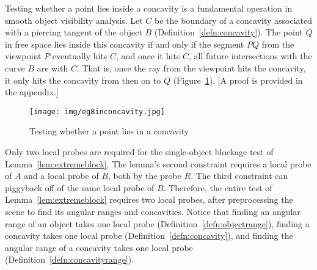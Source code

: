 \documentclass[10pt,twocolumn]{article}
\newcommand{\ray}[1]{\mbox{$\vec{#1}$}}
\newcommand{\seg}[1]{\mbox{$\overline{#1}$}}
\begin{document}

Testing whether a point lies inside a concavity 
is a fundamental operation in smooth object visibility analysis.
Let $C$ be the boundary of a concavity 
associated with a piercing tangent of the object $B$ (Definition~\ref{defn:concavity}).
The point $Q$ in free space lies inside this concavity
if and only if the segment \seg{PQ} from the viewpoint $P$
eventually hits $C$, and once it hits $C$, all future intersections with the curve $B$ 
are with $C$.
That is, once the ray from the viewpoint 
hits the concavity, it only hits the concavity from then on to $Q$ 
(Figure~\ref{fig:inconcavity}).
[A proof is provided in the appendix.]

\begin{figure}
\begin{center}
\texttt{[image: img/eg8inconcavity.jpg]}
\end{center}
\caption{Testing whether a point lies in a concavity}
\label{fig:inconcavity}
\end{figure}

Only two local probes are required for 
the single-object blockage test of Lemma~\ref{lem:extremeblock}.
The lemma's second constraint requires a local probe of $A$ and a local probe of $B$,
both by the probe $R$.
The third constraint can piggyback off of the same local probe of $B$.
Therefore, the entire test of Lemma~\ref{lem:extremeblock} requires two local probes,
after preprocessing the scene to find its angular ranges and concavities.
Notice that finding an angular range of an object takes one local probe 
(Definition~\ref{defn:objectrange}),
finding a concavity takes one local probe (Definition~\ref{defn:concavity}),
and finding the angular range of a concavity takes one local probe (Definition~\ref{defn:concavityrange}).
\end{document}
